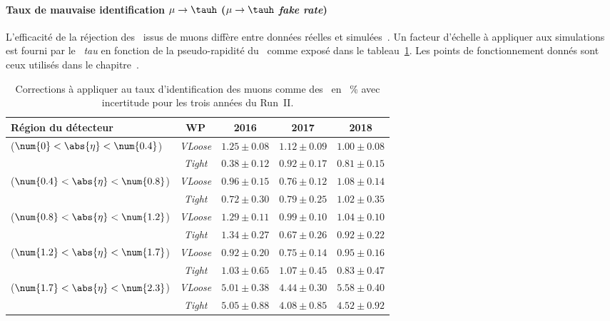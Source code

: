 \paragraph{Taux de mauvaise identification $\mu\to\tauh$ (\emph{$\mu\to\tauh$ fake rate})}
L'efficacité de la réjection des \ftauhs\ issus de muons diffère entre données réelles et simulées~\cite{TauPOG}.
Un facteur d'échelle à appliquer aux simulations est fourni par le \POG\ \emph{tau} en fonction de la pseudo-rapidité du \ftauh\ comme exposé dans le tableau~\ref{tab-chapter-CMS-section-taus-corrections-mu_to_tau_SF}.
Les points de fonctionnement donnés sont ceux utilisés dans le chapitre~.
\begin{table}[h]
\centering
\begin{tabular}{lcccc}
\toprule
Région du détecteur & WP & 2016 & 2017 & 2018 \\
\midrule
($\num{0}<\abs{\eta}<\num{0.4}$) & \emph{VLoose} & $\num{1.25}\pm\num{0.08}$ & $\num{1.12}\pm\num{0.09}$ & $\num{1.00}\pm\num{0.08}$ \\
 & \emph{Tight} & $\num{0.38}\pm\num{0.12}$ & $\num{0.92}\pm\num{0.17}$ & $\num{0.81}\pm\num{0.15}$ \\
($\num{0.4}<\abs{\eta}<\num{0.8}$) & \emph{VLoose} & $\num{0.96}\pm\num{0.15}$ & $\num{0.76}\pm\num{0.12}$ & $\num{1.08}\pm\num{0.14}$ \\
 & \emph{Tight} & $\num{0.72}\pm\num{0.30}$ & $\num{0.79}\pm\num{0.25}$ & $\num{1.02}\pm\num{0.35}$ \\
($\num{0.8}<\abs{\eta}<\num{1.2}$) & \emph{VLoose} & $\num{1.29}\pm\num{0.11}$ & $\num{0.99}\pm\num{0.10}$ & $\num{1.04}\pm\num{0.10}$ \\
 & \emph{Tight} & $\num{1.34}\pm\num{0.27}$ & $\num{0.67}\pm\num{0.26}$ & $\num{0.92}\pm\num{0.22}$ \\
($\num{1.2}<\abs{\eta}<\num{1.7}$) & \emph{VLoose} & $\num{0.92}\pm\num{0.20}$ & $\num{0.75}\pm\num{0.14}$ & $\num{0.95}\pm\num{0.16}$ \\
 & \emph{Tight} & $\num{1.03}\pm\num{0.65}$ & $\num{1.07}\pm\num{0.45}$ & $\num{0.83}\pm\num{0.47}$ \\
($\num{1.7}<\abs{\eta}<\num{2.3}$) & \emph{VLoose} & $\num{5.01}\pm\num{0.38}$ & $\num{4.44}\pm\num{0.30}$ & $\num{5.58}\pm\num{0.40}$ \\
 & \emph{Tight} & $\num{5.05}\pm\num{0.88}$ & $\num{4.08}\pm\num{0.85}$ & $\num{4.52}\pm\num{0.92}$ \\
\bottomrule
\end{tabular}
\caption[Corrections au taux d'identification des muons comme des \tauh.]{Corrections à appliquer au taux d'identification des muons comme des \tauh\ en \SI{}{\%} avec incertitude pour les trois années du Run~II.}
\label{tab-chapter-CMS-section-taus-corrections-mu_to_tau_SF}
\end{table}
